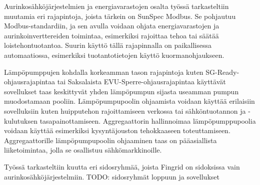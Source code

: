 Aurinkosähköjärjestelmien ja energiavarastojen osalta työssä tarkasteltiin muutamia eri rajapintoja, joista tärkein on SunSpec Modbus. Se pohjautuu Modbus-standardiin, ja sen avulla voidaan ohjata energiavarastojen ja aurinkoinverttereiden toimintaa, esimerkiksi rajoittaa tehoa tai säätää loistehontuotantoa. Suurin käyttö tällä rajapinnalla on paikallisessa automaatiossa, esimerkiksi tuotantotietojen käyttö kuormanohjaukseen.

Lämpöpumppujen kohdalla korkeamman tason rajapintoja kuten SG-Ready-ohjausrajapintaa tai Saksalaista EVU-Sperre-ohjausrajapintaa käyttävät sovellukset taas keskittyvät yhden lämpöpumpun sijasta useamman pumpun muodostamaan pooliin. Lämpöpumpupoolin ohjaamista voidaan käyttää erilaisiin sovelluksiin kuten huipputehon rajoittamiseen verkossa tai sähköntuotannon ja -kulutuksen tasapainottamiseen. Aggregaattorin hallinnoimaa lämpöpumppupoolia voidaan käyttää esimerkiksi kysyntäjouston tehokkaaseen toteuttamiseen. Aggregaattorille lämpöpumpupoolin ohjaaminen taas on pääasiallista liiketoimintaa, jolla se osallistuu sähkömarkkinoille.

Työssä tarkasteltiin kuutta eri sidosryhmää, joista Fingrid on sidoksissa vain aurinkosähköjärjestelmiin. TODO: sidosryhmät loppuun ja sovellukset
